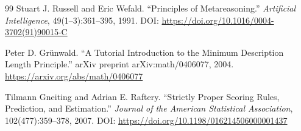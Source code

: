 \documentclass[11pt,a4paper]{ctexart}
\numberwithin{equation}{section}
\theoremstyle{definition}
\theoremstyle{plain}
\begin{document}
\begin{thebibliography}{99}
Stuart J. Russell and Eric Wefald.
\newblock ``Principles of Metareasoning.''
\newblock \textit{Artificial Intelligence}, 49(1--3):361--395, 1991.
\newblock DOI: \url{https://doi.org/10.1016/0004-3702(91)90015-C}

Peter D. Grünwald.
\newblock ``A Tutorial Introduction to the Minimum Description Length Principle.''
\newblock arXiv preprint arXiv:math/0406077, 2004.
\newblock \url{https://arxiv.org/abs/math/0406077}

Tilmann Gneiting and Adrian E. Raftery.
\newblock ``Strictly Proper Scoring Rules, Prediction, and Estimation.''
\newblock \textit{Journal of the American Statistical Association}, 102(477):359--378, 2007.
\newblock DOI: \url{https://doi.org/10.1198/016214506000001437}

\end{thebibliography}
\end{document}
